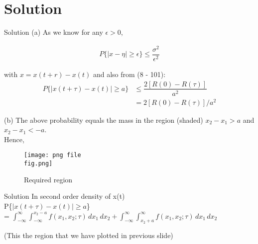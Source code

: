 \documentclass[15pt]{beamer}
\begin{document}
    \section{Solution}
    \begin{frame}{Solution}
        (a) As we know for any $\epsilon > 0$,
        \begin{center}
            \begin{align}
                P\{|x - \eta| \geq \epsilon \} \leq \dfrac{\sigma^2}{\epsilon^2}
            \end{align}
        \end{center}
        with $x = x(t + r) - x(t)$ and also from (8 - 101):
        \begin{align}
            P\{|x(t + \tau) - x(t)| \geq a \} &\leq \dfrac{2[R(0) - R(\tau)]}{a^2} \\
            &= 2[R(0) - R(\tau)]/a^2
        \end{align}
    \end{frame}
    \begin{frame}
        (b)
        The above probability equals the mass in the region (shaded) $x_2 - x_1 > a$ and $x_2 - x_1 < -a$.\\
        Hence,
    \end{frame}
    \begin{frame}
        \begin{figure}[h]
            \centering
            \texttt{[image: png file\\fig.png]}
            \caption{Required region}
            \label{fig.}
        \end{figure}
    \end{frame}
    \begin{frame}{Solution}
        In second order density of x(t)\\
        P\{$|x(t + \tau) - x(t)| \geq a $\} \\

        = $\int_{-\infty}^{\infty}\int_{-\infty}^{x_2 - a} f(x_1,x_2;\tau) \,dx_1\,dx_2 + \int_{-\infty}^{\infty}\int_{x_2 + a}^{\infty} f(x_1,x_2;\tau) \,dx_1\,dx_2$

         (This the region that we have plotted in previous slide)
    \end{frame}
\end{document}
